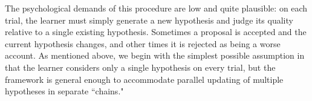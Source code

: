 \documentclass[3p,twocolumn,authoryear,10pt]{elsarticle}
\begin{document}
The psychological demands of this procedure are low and quite plausible: on each trial, the learner must simply generate a new hypothesis and judge its quality relative to a single existing hypothesis.  Sometimes a proposal is accepted and the current hypothesis changes, and other times it is rejected as being a worse account.  As mentioned above, we begin with the simplest possible assumption in that the learner considers only a single hypothesis on every trial, but the framework is general enough to accommodate parallel updating of multiple hypotheses in separate ``chains." \\




\end{document}
